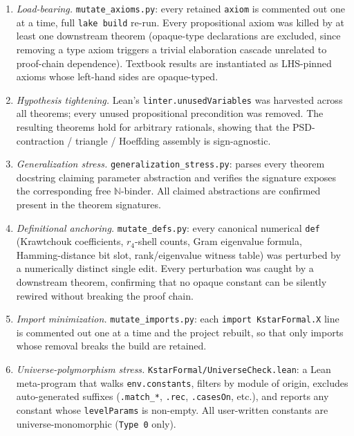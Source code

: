 \documentclass[twocolumn,prx,aps,superscriptaddress,longbibliography]{revtex4-2}
\begin{document}
\begin{enumerate}\setlength\itemsep{0pt}\emergencystretch=2em
\item[\textbf{(i)}]
\emph{Load-bearing.}
\texttt{mutate\_axioms.py}: every retained \texttt{axiom} is
commented out one at a time, full \texttt{lake build} re-run.
Every propositional axiom was killed by at least one downstream
theorem (opaque-type declarations are excluded, since removing a
type axiom triggers a trivial elaboration cascade unrelated to
proof-chain dependence). Textbook results are instantiated as
LHS-pinned axioms whose left-hand sides are opaque-typed.
\item[\textbf{(ii)}]
\emph{Hypothesis tightening.}
Lean's \texttt{linter.\allowbreak{}unusedVariables} was harvested across all
theorems; every unused propositional precondition was
removed. The resulting theorems hold for arbitrary rationals,
showing that the PSD-contraction / triangle / Hoeffding
assembly is sign-agnostic.
\item[\textbf{(iii)}]
\emph{Generalization stress.}
\texttt{generalization\_\allowbreak{}stress.py}: parses every theorem
docstring claiming parameter abstraction
and verifies the
signature exposes the corresponding free
$\mathbb N$-binder.
All claimed abstractions are confirmed present in the theorem
signatures.
\item[\textbf{(iv)}]
\emph{Definitional anchoring.}
\texttt{mutate\_defs.py}: every canonical numerical
\texttt{def} (Krawtchouk coefficients,
$r_4$-shell counts, Gram eigenvalue formula,
Hamming-distance bit slot, rank/eigenvalue
witness table) was perturbed by a numerically distinct
single edit. Every perturbation was caught by a downstream theorem,
confirming that no opaque constant can be silently rewired without
breaking the proof chain.
\item[\textbf{(v)}]
\emph{Import minimization.}
\texttt{mutate\_imports.py}: each
\texttt{import KstarFormal.X} line is commented out one
at a time and the project rebuilt, so that only imports whose
removal breaks the build are retained.
\item[\textbf{(vi)}]
\emph{Universe-polymorphism stress.}
\texttt{KstarFormal/\allowbreak{}UniverseCheck.lean}: a Lean meta-program
that walks \texttt{env.constants}, filters by module of origin,
excludes auto-generated suffixes (\texttt{.match\_*},
\texttt{.rec}, \texttt{.casesOn}, etc.), and reports any
constant whose \texttt{levelParams} is non-empty. All
user-written constants are universe-monomorphic
(\texttt{Type\,0} only).
\end{enumerate}
\end{document}

